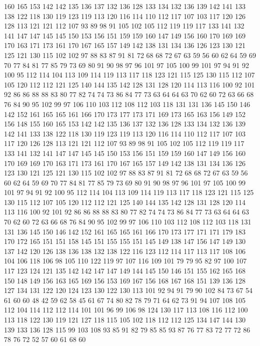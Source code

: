 160 165 153 142 142 135 136 137 132 136 128 133 134 132 136 139 142 141 133 138
122 118 130 119 123 119 113 120 116 114 110 112 117 107 103 117 120 126 128 113
121 121 112 107 93 89 98 91 105 102 105 112 119 119 117 133 141 132 141 147
147 145 145 150 153 156 151 159 159 160 147 149 156 160 170 169 169 170 163 171
173 161 170 167 165 157 149 142 138 131 134 136 126 123 130 121 125 121 130 115
102 102 97 88 83 87 91 81 72 68 68 72 67 63 59 56 60 62 64 59
69 70 77 84 81 77 85 79 73 69 80 91 90 98 97 96 101 97 105 100
99 101 97 94 91 92 100 95 112 114 104 113 109 114 119 113 117 118 123 121
115 125 130 115 112 107 105 120 112 112 121 125 140 144 135 142 128 131 128 120
114 113 116 100 92 101 92 86 86 88 88 83 80 77 82 74 74 73 86 84
77 73 63 64 64 63 70 62 60 72 63 66 68 76 84 90 95 102 99 97
106 110 103 112 108 112 103 118 131 131 136 145 150 146 142 152 161 165 165 161
166 170 173 177 173 171 169 173 165 163 156 149 152 156 148 155 160 165 153 142
142 135 136 137 132 136 128 133 134 132 136 139 142 141 133 138 122 118 130 119
123 119 113 120 116 114 110 112 117 107 103 117 120 126 128 113 121 121 112 107
93 89 98 91 105 102 105 112 119 119 117 133 141 132 141 147 147 145 145 150
153 156 151 159 159 160 147 149 156 160 170 169 169 170 163 171 173 161 170 167
165 157 149 142 138 131 134 136 126 123 130 121 125 121 130 115 102 102 97 88
83 87 91 81 72 68 68 72 67 63 59 56 60 62 64 59 69 70 77 84
81 77 85 79 73 69 80 91 90 98 97 96 101 97 105 100 99 101 97 94
91 92 100 95 112 114 104 113 109 114 119 113 117 118 123 121 115 125 130 115
112 107 105 120 112 112 121 125 140 144 135 142 128 131 128 120 114 113 116 100
92 101 92 86 86 88 88 83 80 77 82 74 74 73 86 84 77 73 63 64
64 63 70 62 60 72 63 66 68 76 84 90 95 102 99 97 106 110 103 112
108 112 103 118 131 131 136 145 150 146 142 152 161 165 165 161 166 170 173 177
171 171 179 183 170 172 165 151 151 158 145 151 155 155 151 145 149 138 147 156
147 149 130 137 142 120 126 138 136 138 132 138 122 116 123 112 114 117 113 117
108 106 104 106 118 106 98 105 110 122 119 97 107 116 109 101 79 79 95 82
97 100 107 117 123 124 121 135 142 142 147 147 149 144 145 150 146 151 155 162
165 168 150 148 149 156 163 165 169 156 153 169 167 156 168 167 168 151 139 136
128 127 134 131 122 120 124 123 130 122 130 113 101 92 94 91 79 90 102 84
73 67 54 61 60 60 48 42 59 62 58 45 61 67 74 80 82 78 79 71
64 62 73 91 94 107 108 105 112 104 114 112 112 114 101 101 96 99 106 98
124 130 117 113 108 116 112 100 113 118 122 130 119 121 127 118 115 105 102 118
112 112 125 134 147 144 130 139 133 136 128 115 99 103 108 93 85 91 82 79
85 85 93 87 76 77 83 72 77 72 86 78 76 72 52 57 60 61 68 60
